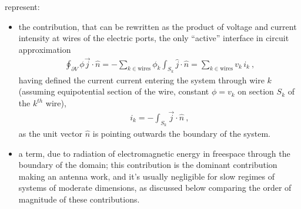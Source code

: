 \documentclass[letterpaper,10pt,english]{jupyterBook}
\begin{document}
\sphinxAtStartPar
{} represent:
\begin{itemize}
\item {} 
\sphinxAtStartPar
the  contribution, that can be re\sphinxhyphen{}written as the product of voltage and current intensity at wires of the electric ports, the only “active” interface in circuit approximation
\begin{equation*}
\begin{split}\oint_{\partial V} \phi \vec{j} \cdot \hat{n} = - \sum_{k \in \text{wires}} \phi_k \int_{S_k} \hat{j} \cdot \hat{n} = \sum_{k \in \text{wires}} v_k \, i_k \ ,\end{split}
\end{equation*}
\sphinxAtStartPar
having defined the current current entering the system through wire \(k\) (assuming equipotential section of the wire, constant \(\phi = v_k\) on section \(S_k\) of the \(k^{th}\) wire),
\begin{equation*}
\begin{split}i_k = - \int_{S_k} \vec{j} \cdot \hat{n} \ ,\end{split}
\end{equation*}
\sphinxAtStartPar
as the unit vector \(\hat{n}\) is pointing outwards the boundary of the system.

\item {} 
\sphinxAtStartPar
a  term, due to radiation of electromagnetic energy in free\sphinxhyphen{}space through the boundary of the domain; this contribution is the dominant contribution making an antenna work, and it’s usually negligible for slow regimes of systems of moderate dimensions, as discussed below comparing the order of magnitude of these contributions.

\end{itemize}
\end{document}
